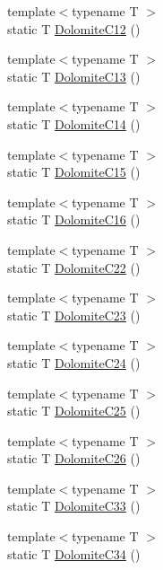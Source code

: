 \begin{DoxyCompactItemize}
\item 
{\footnotesize template$<$typename T $>$ }\\static T \mbox{\hyperlink{namespacempc_1_1data_acb49463f06f062c08d528fe7606db9ca}{Dolomite\+C12}} ()
\item 
{\footnotesize template$<$typename T $>$ }\\static T \mbox{\hyperlink{namespacempc_1_1data_a3ed324e37c29fe212035c94372e6aacd}{Dolomite\+C13}} ()
\item 
{\footnotesize template$<$typename T $>$ }\\static T \mbox{\hyperlink{namespacempc_1_1data_afb2df6dec5818bb54688e66b04e4612a}{Dolomite\+C14}} ()
\item 
{\footnotesize template$<$typename T $>$ }\\static T \mbox{\hyperlink{namespacempc_1_1data_a19061414cd5851d6f1466fbf6f80d949}{Dolomite\+C15}} ()
\item 
{\footnotesize template$<$typename T $>$ }\\static T \mbox{\hyperlink{namespacempc_1_1data_a55ae58636a2c30a0b7d2c6decef19aea}{Dolomite\+C16}} ()
\item 
{\footnotesize template$<$typename T $>$ }\\static T \mbox{\hyperlink{namespacempc_1_1data_aa9f934047b1829f83b57763ee6b733f7}{Dolomite\+C22}} ()
\item 
{\footnotesize template$<$typename T $>$ }\\static T \mbox{\hyperlink{namespacempc_1_1data_a1374a3e15c7252506bf3007a2331f722}{Dolomite\+C23}} ()
\item 
{\footnotesize template$<$typename T $>$ }\\static T \mbox{\hyperlink{namespacempc_1_1data_a3535dc6953cb63a6ee50825e1d2cfbbd}{Dolomite\+C24}} ()
\item 
{\footnotesize template$<$typename T $>$ }\\static T \mbox{\hyperlink{namespacempc_1_1data_a7d251a476a8060a491588111c3f68ab3}{Dolomite\+C25}} ()
\item 
{\footnotesize template$<$typename T $>$ }\\static T \mbox{\hyperlink{namespacempc_1_1data_aa98a61022864565d891d7bfae59998d0}{Dolomite\+C26}} ()
\item 
{\footnotesize template$<$typename T $>$ }\\static T \mbox{\hyperlink{namespacempc_1_1data_ab41abc60d3226a2b44ed34095c63cfde}{Dolomite\+C33}} ()
\item 
{\footnotesize template$<$typename T $>$ }\\static T \mbox{\hyperlink{namespacempc_1_1data_a0cad13301a96a06a061d5203895efeeb}{Dolomite\+C34}} ()

\end{DoxyCompactItemize}
